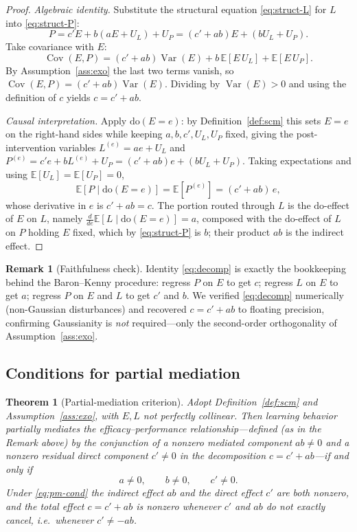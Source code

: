 \documentclass{amsart}
\newtheorem{theorem}{Theorem}
\theoremstyle{definition}
\newtheorem{remark}{Remark}
\begin{document}
\begin{proof}
\emph{Algebraic identity.} Substitute the structural equation
\eqref{eq:struct-L} for $L$ into \eqref{eq:struct-P}:
\[
P=c'E+b(aE+U_L)+U_P=(c'+ab)E+(bU_L+U_P).
\]
Take covariance with $E$:
\[
\operatorname{Cov}(E,P)=(c'+ab)\operatorname{Var}(E)
+b\,\mathbb E[E\,U_L]+\mathbb E[E\,U_P].
\]
By Assumption~\ref{ass:exo} the last two terms vanish, so
$\operatorname{Cov}(E,P)=(c'+ab)\operatorname{Var}(E)$. Dividing by
$\operatorname{Var}(E)>0$ and using the definition of $c$ yields
$c=c'+ab$.

\emph{Causal interpretation.} Apply $\mathrm{do}(E=e)$: by
Definition~\ref{def:scm} this sets $E=e$ on the right-hand sides while keeping
$a,b,c',U_L,U_P$ fixed, giving the post-intervention variables
$L^{(e)}=ae+U_L$ and
$P^{(e)}=c'e+bL^{(e)}+U_P=(c'+ab)e+(bU_L+U_P)$. Taking expectations and using
$\mathbb E[U_L]=\mathbb E[U_P]=0$,
\[
\mathbb E[P\mid\mathrm{do}(E=e)]=\mathbb E[P^{(e)}]=(c'+ab)\,e,
\]
whose derivative in $e$ is $c'+ab=c$. The portion routed through $L$ is the
$\mathrm{do}$-effect of $E$ on $L$, namely $\frac{d}{de}\mathbb E[L\mid\mathrm{do}(E=e)]=a$,
composed with the $\mathrm{do}$-effect of $L$ on $P$ holding $E$ fixed, which by
\eqref{eq:struct-P} is $b$; their product $ab$ is the indirect effect.
\end{proof}

\begin{remark}[Faithfulness check]
Identity \eqref{eq:decomp} is exactly the bookkeeping behind the Baron--Kenny
procedure: regress $P$ on $E$ to get $c$; regress $L$ on $E$ to get $a$;
regress $P$ on $E$ and $L$ to get $c'$ and $b$. We verified \eqref{eq:decomp}
numerically (non-Gaussian disturbances) and recovered $c=c'+ab$ to floating
precision, confirming Gaussianity is \emph{not} required---only the second-order
orthogonality of Assumption~\ref{ass:exo}.
\end{remark}

\subsection{Conditions for partial mediation}

\begin{theorem}[Partial-mediation criterion]\label{thm:partial}
Adopt Definition~\ref{def:scm} and Assumption~\ref{ass:exo}, with $E,L$ not
perfectly collinear. Then learning behavior \emph{partially mediates} the
efficacy--performance relationship---defined (as in the Remark above) by the
conjunction of a nonzero mediated component $ab\neq0$ and a nonzero residual
direct component $c'\neq0$ in the decomposition $c=c'+ab$---\emph{if and only
if}
\begin{equation}\label{eq:pm-cond}
a\neq0,\qquad b\neq0,\qquad c'\neq0 .
\end{equation}
Under \eqref{eq:pm-cond} the indirect effect $ab$ and the direct effect $c'$
are both nonzero, and the total effect $c=c'+ab$ is nonzero whenever
$c'$ and $ab$ do not exactly cancel, i.e.\ whenever $c'\neq-ab$.
\end{theorem}
\end{document}
